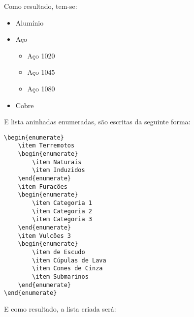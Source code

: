 Como resultado, tem-se:

\begin{itemize}
    \item Alumínio
    \item Aço
    \begin{itemize}
        \item Aço 1020
        \item Aço 1045
        \item Aço 1080
    \end{itemize}
    \item Cobre
\end{itemize}

E lista aninhadas enumeradas, são escritas da seguinte forma:

\begin{verbatim}
\begin{enumerate}
    \item Terremotos
    \begin{enumerate}
        \item Naturais
        \item Induzidos
    \end{enumerate}
    \item Furacões
    \begin{enumerate}
        \item Categoria 1
        \item Categoria 2
        \item Categoria 3
    \end{enumerate}
    \item Vulcões 3
    \begin{enumerate}
        \item de Escudo
        \item Cúpulas de Lava
        \item Cones de Cinza
        \item Submarinos
    \end{enumerate}
\end{enumerate}
\end{verbatim}

E como resultado, a lista criada será:

